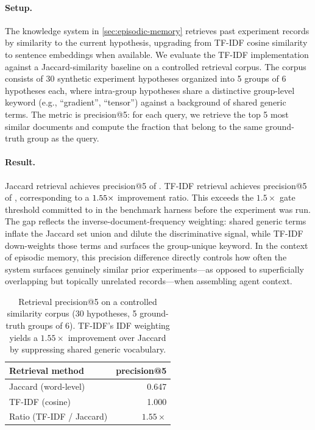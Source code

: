 \paragraph{Setup.}
The knowledge system in \cref{sec:episodic-memory} retrieves past experiment records by similarity to the current hypothesis, upgrading from TF-IDF cosine similarity to sentence embeddings when available.
We evaluate the TF-IDF implementation against a Jaccard-similarity baseline on a controlled retrieval corpus.
The corpus consists of 30 synthetic experiment hypotheses organized into 5 groups of 6 hypotheses each, where intra-group hypotheses share a distinctive group-level keyword (e.g., ``gradient'', ``tensor'') against a background of shared generic terms.
The metric is precision@5: for each query, we retrieve the top 5 most similar documents and compute the fraction that belong to the same ground-truth group as the query.

\paragraph{Result.}
Jaccard retrieval achieves precision@5 of \retrievalJaccard.
TF-IDF retrieval achieves precision@5 of \retrievalTFIDF, corresponding to a $1.55\times$ improvement ratio.
This exceeds the $1.5\times$ gate threshold committed to in the benchmark harness before the experiment was run.
The gap reflects the inverse-document-frequency weighting: shared generic terms inflate the Jaccard set union and dilute the discriminative signal, while TF-IDF down-weights those terms and surfaces the group-unique keyword.
In the context of episodic memory, this precision difference directly controls how often the system surfaces genuinely similar prior experiments---as opposed to superficially overlapping but topically unrelated records---when assembling agent context.

\begin{table}[t]
  \centering
  \caption{Retrieval precision@5 on a controlled similarity corpus (30 hypotheses, 5 ground-truth groups of 6). TF-IDF's IDF weighting yields a $1.55\times$ improvement over Jaccard by suppressing shared generic vocabulary.}
  \label{tab:gate-retrieval}
  \small
  \begin{tabular}{@{}lr@{}}
    \toprule
    Retrieval method & precision@5 \\
    \midrule
    Jaccard (word-level) & 0.647 \\
    TF-IDF (cosine) & 1.000 \\
    \midrule
    Ratio (TF-IDF / Jaccard) & $1.55\times$ \\
    \bottomrule
  \end{tabular}
\end{table}

